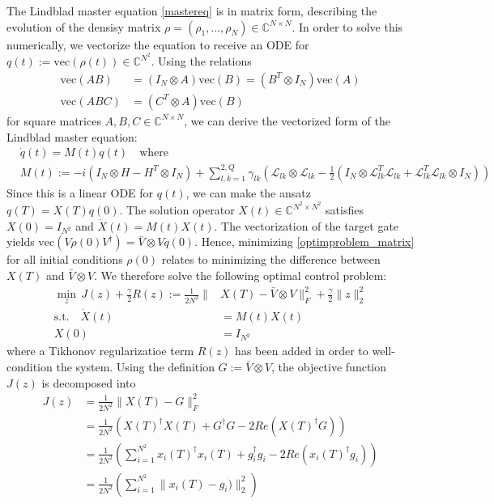 \documentclass[letterpaper]{article}
\newcommand{\Ell}{\mathcal{L}}
\newcommand{\C}{\mathds{C}}
\begin{document}
The Lindblad master equation \eqref{mastereq} is in matrix form, describing the evolution of the densisy matrix $\rho = (\rho_1, \dots, \rho_N) \in \C^{N\times N}$. In order to solve this numerically, we vectorize the equation to receive an ODE for $q(t) := \text{vec}(\rho(t)) \in \C^{N^2}$. Using the relations
\begin{align}
  \text{vec}(AB) &= (I_N\otimes A)\text{vec}(B) = (B^T\otimes I_N)\text{vec}(A) \\
  \text{vec}(ABC) &= (C^T\otimes A)\text{vec}(B)
\end{align}
for square matrices $A,B,C\in\C^{N\times N}$, we can derive the vectorized form of the Lindblad master equation:
\begin{align}\label{mastereq_vectorized}
  &\dot q(t) = M(t) q(t) \quad  \text{where} \\
  &M(t) := -i(I_N\otimes H - H^T \otimes I_N) + \sum_{l,k=1}^{2,Q} \gamma_{lk} \left( \Ell_{lk}\otimes \Ell_{lk} - \frac 1 2 \left( I_N\otimes \Ell^T_{lk}\Ell_{lk} + \Ell^T_{lk}\Ell_{lk} \otimes I_N \right) \right)
\end{align}
Since this is a linear ODE for $q(t)$, we can make the ansatz $q(T) = X(T) q(0)$. The solution operator $X(t) \in \C^{N^2\times N^2}$ satisfies $X(0) = I_{N^2}$ and $\dot X(t) = M(t) X(t)$. The vectorization of the target gate yields $\text{vec}(V\rho(0)V^{\dagger}) = \bar V\otimes V q(0)$. Hence, minimizing \eqref{optimproblem_matrix} for all initial conditions $\rho(0)$ relates to minimizing the difference between $X(T)$ and $\bar V\otimes V$. We therefore solve the following optimal control problem:
\begin{align}\label{optimproblem_final}
  \min_z \, J(z) + \frac{\gamma}{2}R(z) := \frac {1}{2N^2} \| &X(T) - \bar V \otimes V \|^2_F + \frac{\gamma}{2} \|z\|^2_2 \\
  \text{s.t.} \quad \dot X(t) &= M(t) X(t)  \\
                    X(0) &= I_{N^2}
\end{align}
where a Tikhonov regularizatioe term $R(z)$ has been added in order to well-condition the system. Using the definition $G := \bar V\otimes V$, the objective function $J(z)$ is decomposed into
\begin{align}
  J(z) &= \frac{1}{2N^2} \| X(T) - G\|^2_F \\
       &= \frac{1}{2N^2} \left( X(T)^{\dagger}X(T) + G^{\dagger}G - 2Re(X(T)^{\dagger}G) \right) \\
       &= \frac{1}{2N^2} \left( \sum_{i=1}^{N^2} x_i(T)^{\dagger}x_i(T) + g_i^{\dagger}g_i - 2Re(x_i(T)^{\dagger}g_i) \right) \\
       &= \frac{1}{2N^2} \left( \sum_{i=1}^{N^2} \| x_i(T) - g_i) \|^2_2 \right) \\
\end{align}
\end{document}
